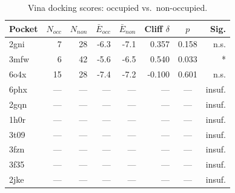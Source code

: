 \begin{table}[t]
\centering
\caption{Vina docking scores: occupied vs.\ non-occupied.}
\label{tab:vina_stats}
\begin{tabular}{lrrrrrcr}
\toprule
Pocket & $N_{occ}$ & $N_{non}$ & $\bar{E}_{occ}$ & $\bar{E}_{non}$ & Cliff $\delta$ & $p$ & Sig. \\
\midrule
2gni & 7 & 28 & -6.3 & -7.1 & 0.357 & 0.158 & n.s. \\
3mfw & 6 & 42 & -5.6 & -6.5 & 0.540 & 0.033 & * \\
6o4x & 15 & 28 & -7.4 & -7.2 & -0.100 & 0.601 & n.s. \\
6phx & — & — & — & — & — & — & insuf. \\
2gqn & — & — & — & — & — & — & insuf. \\
1h0r & — & — & — & — & — & — & insuf. \\
3t09 & — & — & — & — & — & — & insuf. \\
3fzn & — & — & — & — & — & — & insuf. \\
3f35 & — & — & — & — & — & — & insuf. \\
2jke & — & — & — & — & — & — & insuf. \\
\bottomrule
\end{tabular}
\end{table}
